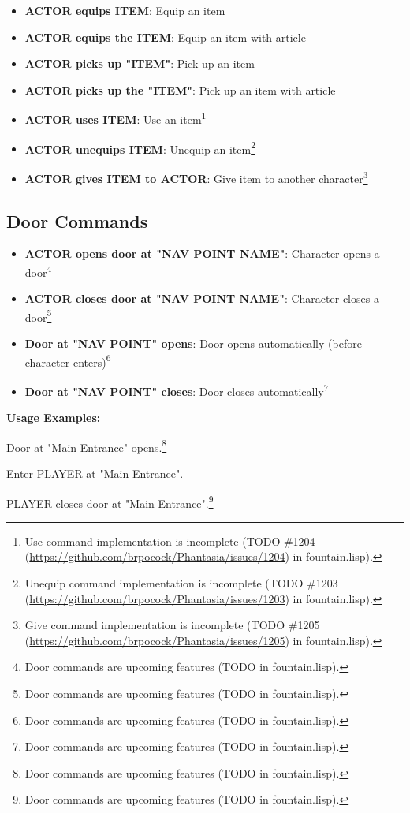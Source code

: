 \documentclass[11pt,letterpaper,oldstylefigures]{memoir}
\newcommand{\stagedir}[1]{#1\par\vspace{1\baselineskip}}
\newenvironment{FountainExample}
  {\begingroup
  \ttfamily\small
   \setlength{\parindent}{0pt}
  \setlength{\parskip}{0.5em}
  \allowdisplaybreaks
  \setlength{\displaywidowpenalty}{0}
  \setlength{\widowpenalty}{0}
  \setlength{\clubpenalty}{0}
  \setlength{\interlinepenalty}{0}
}
  {\endgroup}
\newcommand{\fountain}[1]{\textbf{#1}}
\begin{document}
\begin{itemize}
\item \fountain{ACTOR equips ITEM}: Equip an item
\item \fountain{ACTOR equips the ITEM}: Equip an item with article
\item \fountain{ACTOR picks up "ITEM"}: Pick up an item
\item \fountain{ACTOR picks up the "ITEM"}: Pick up an item with article
\item \fountain{ACTOR uses ITEM}: Use an item\footnote{Use command implementation is incomplete (TODO \#1204 (\href{https://github.com/brpocock/Phantasia/issues/1204}{https://github.com/brpocock/Phantasia/issues/1204}) in fountain.lisp).}
\item \fountain{ACTOR unequips ITEM}: Unequip an item\footnote{Unequip command implementation is incomplete (TODO \#1203 (\href{https://github.com/brpocock/Phantasia/issues/1203}{https://github.com/brpocock/Phantasia/issues/1203}) in fountain.lisp).}
\item \fountain{ACTOR gives ITEM to ACTOR}: Give item to another character\footnote{Give command implementation is incomplete (TODO \#1205 (\href{https://github.com/brpocock/Phantasia/issues/1205}{https://github.com/brpocock/Phantasia/issues/1205}) in fountain.lisp).}
\end{itemize}

\subsection{Door Commands}
\begin{itemize}
\item \fountain{ACTOR opens door at "NAV POINT NAME"}: Character opens a door\footnote{Door commands are upcoming features (TODO in fountain.lisp).}
\item \fountain{ACTOR closes door at "NAV POINT NAME"}: Character closes a door\footnote{Door commands are upcoming features (TODO in fountain.lisp).}
\item \fountain{Door at "NAV POINT" opens}: Door opens automatically (before character enters)\footnote{Door commands are upcoming features (TODO in fountain.lisp).}
\item \fountain{Door at "NAV POINT" closes}: Door closes automatically\footnote{Door commands are upcoming features (TODO in fountain.lisp).}
\end{itemize}

\textbf{Usage Examples:}
\begin{FountainExample}
\stagedir{Door at "Main Entrance" opens.\footnote{Door commands are upcoming features (TODO in fountain.lisp).}}
\stagedir{Enter PLAYER at "Main Entrance".}
\stagedir{PLAYER closes door at "Main Entrance".\footnote{Door commands are upcoming features (TODO in fountain.lisp).}}
\end{FountainExample}
\end{document}
